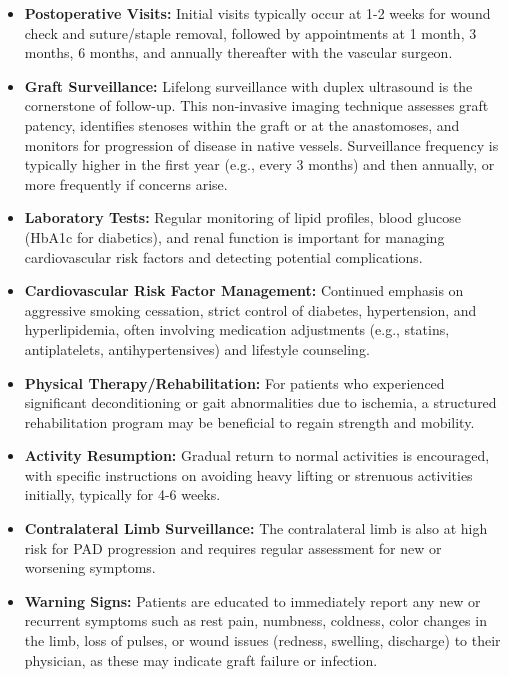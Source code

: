 \begin{itemize}
  \item \textbf{Postoperative Visits:} Initial visits typically occur at 1-2 weeks for wound check and suture/staple removal, followed by appointments at 1 month, 3 months, 6 months, and annually thereafter with the vascular surgeon.
  
  \item \textbf{Graft Surveillance:} Lifelong surveillance with duplex ultrasound is the cornerstone of follow-up. This non-invasive imaging technique assesses graft patency, identifies stenoses within the graft or at the anastomoses, and monitors for progression of disease in native vessels. Surveillance frequency is typically higher in the first year (e.g., every 3 months) and then annually, or more frequently if concerns arise.
  
  \item \textbf{Laboratory Tests:} Regular monitoring of lipid profiles, blood glucose (HbA1c for diabetics), and renal function is important for managing cardiovascular risk factors and detecting potential complications.
  
  \item \textbf{Cardiovascular Risk Factor Management:} Continued emphasis on aggressive smoking cessation, strict control of diabetes, hypertension, and hyperlipidemia, often involving medication adjustments (e.g., statins, antiplatelets, antihypertensives) and lifestyle counseling.
  
  \item \textbf{Physical Therapy/Rehabilitation:} For patients who experienced significant deconditioning or gait abnormalities due to ischemia, a structured rehabilitation program may be beneficial to regain strength and mobility.
  
  \item \textbf{Activity Resumption:} Gradual return to normal activities is encouraged, with specific instructions on avoiding heavy lifting or strenuous activities initially, typically for 4-6 weeks.
  
  \item \textbf{Contralateral Limb Surveillance:} The contralateral limb is also at high risk for PAD progression and requires regular assessment for new or worsening symptoms.
  
  \item \textbf{Warning Signs:} Patients are educated to immediately report any new or recurrent symptoms such as rest pain, numbness, coldness, color changes in the limb, loss of pulses, or wound issues (redness, swelling, discharge) to their physician, as these may indicate graft failure or infection.
\end{itemize}

